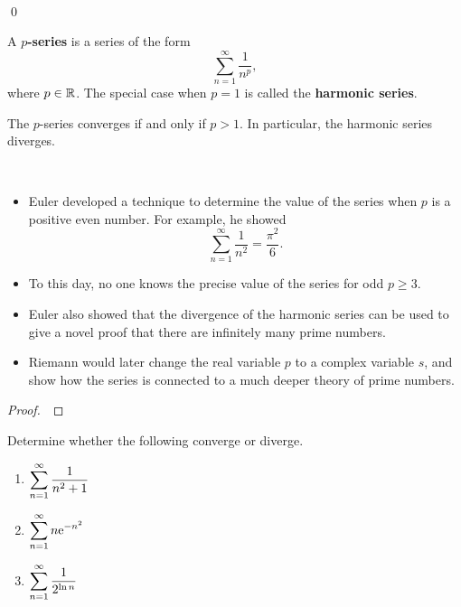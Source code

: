 \newpage

\,

\vspace{8in}

\qed

\newpage

\begin{definition}
A $p$\textbf{-series} is a series of the form
\begin{equation*}
\sum_{n=1}^\infty \frac{1}{n^p},
\end{equation*}
where $p\in\mathbb R$.
The special case when $p=1$ is called the \textbf{harmonic series}.
\end{definition}

\begin{theorem}
The $p$-series converges if and only if $p>1$.
In particular, the harmonic series diverges.
\end{theorem}
\begin{remark}\,
\begin{itemize}
\item Euler developed a technique to determine the value of the series when $p$ is a positive even number.  For example, he showed
\begin{equation*}
\sum_{n=1}^\infty\frac{1}{n^2} = \frac{\pi^2}{6}.
\end{equation*}
\item To this day, no one knows the precise value of the series for odd $p\ge 3$.
\item Euler also showed that the divergence of the harmonic series can be used to give a novel proof that there are infinitely many prime numbers.
\item Riemann would later change the real variable $p$ to a complex variable $s$, and show how the series is connected to a much deeper theory of prime numbers.
\end{itemize}
\end{remark}
\begin{proof}\,

\vspace{4in}
\end{proof}

\newpage

\begin{example}
Determine whether the following converge or diverge.
\begin{enumerate}
\item $\displaystyle\sum_{n=1}^\infty\frac{1}{n^2+1}$
\vfill
\item $\displaystyle\sum_{n=1}^\infty n\mathrm{e}^{-n^2}$
\vfill
\item $\displaystyle\sum_{n=1}^\infty\frac{1}{2^{\ln n}}$
\vfill
\end{enumerate}
\end{example}

